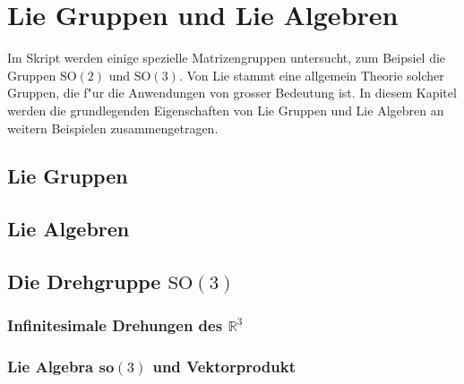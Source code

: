%
%
%
\chapter{Lie Gruppen und Lie Algebren}
Im Skript werden einige spezielle Matrizengruppen untersucht,
zum Beipsiel die Gruppen $\textrm{SO}(2)$ und $\textrm{SO}(3)$.
Von Lie stammt eine allgemein Theorie solcher Gruppen, die f"ur die
Anwendungen von grosser Bedeutung ist.
In diesem Kapitel werden die grundlegenden Eigenschaften von 
Lie Gruppen und Lie Algebren an weitern Beispielen zusammengetragen.

\section{Lie Gruppen}

\section{Lie Algebren}

\section{Die Drehgruppe $\textrm{SO}(3)$}

\subsection{Infinitesimale Drehungen des $\mathbb R^3$}

\subsection{Lie Algebra $\textbf{so}(3)$ und Vektorprodukt}

